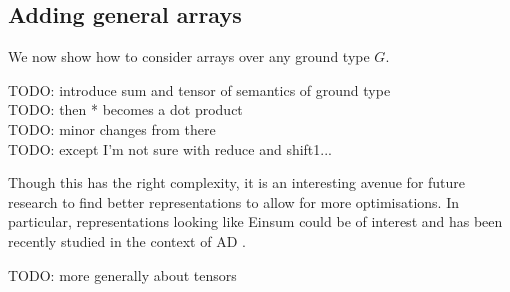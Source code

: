\subsection{Adding general arrays} %
\label{sub:Adding general arrays}

We now show how to consider arrays over any ground type $G$. 

TODO: introduce sum and tensor of semantics of ground type\\
TODO: then * becomes a dot product\\
TODO: minor changes from there\\
TODO: except I'm not sure with reduce and shift1...

Though this has the right complexity, it is an interesting avenue for future research to find
better representations to allow for more optimisations. 
In particular, representations looking like Einsum \cite{van2011numpy} could be of interest 
and has been recently studied in the context of AD \cite{laue2018computing,laue2020simple}.

TODO: more generally about tensors \cite{liao2019differentiable,bernstein2020differentiating}


